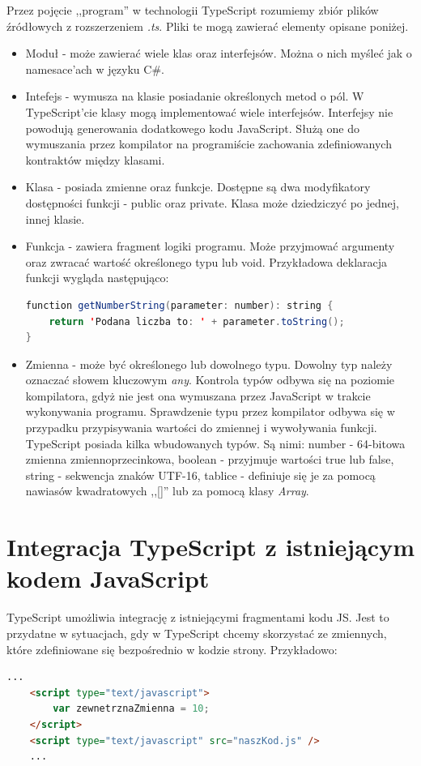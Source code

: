 Przez pojęcie ,,program'' w technologii TypeScript rozumiemy zbiór plików źródłowych z rozszerzeniem \textit{.ts}. Pliki te mogą zawierać elementy opisane poniżej.
\begin{itemize}
\item Moduł - może zawierać wiele klas oraz interfejsów. Można o nich myśleć jak o namesace'ach w języku C\#.
\item Intefejs - wymusza na klasie posiadanie określonych metod o pól. W TypeScript'cie klasy mogą implementować wiele interfejsów. Interfejsy nie powodują generowania dodatkowego kodu JavaScript. Służą one do wymuszania przez kompilator na programiście zachowania zdefiniowanych kontraktów między klasami.
\item Klasa - posiada zmienne oraz funkcje. Dostępne są dwa modyfikatory dostępności funkcji - public oraz private. Klasa może dziedziczyć po jednej, innej klasie.
\item Funkcja - zawiera fragment logiki programu. Może przyjmować argumenty oraz zwracać wartość określonego typu lub void. Przykładowa deklaracja funkcji wygląda następująco:
\begin{lstlisting}[language=Java]
function getNumberString(parameter: number): string {
	return 'Podana liczba to: ' + parameter.toString();
}
\end{lstlisting}
\item Zmienna - może być określonego lub dowolnego typu. Dowolny typ należy oznaczać słowem kluczowym \textit{any}. Kontrola typów odbywa się na poziomie kompilatora, gdyż nie jest ona wymuszana przez JavaScript w trakcie wykonywania programu. Sprawdzenie typu przez kompilator odbywa się w przypadku przypisywania wartości do zmiennej i wywoływania funkcji. TypeScript posiada kilka wbudowanych typów. Są nimi:
\subitem number - 64-bitowa zmienna zmiennoprzecinkowa,
\subitem boolean - przyjmuje wartości true lub false,
\subitem string - sekwencja znaków UTF-16,
\subitem tablice - definiuje się je za pomocą nawiasów kwadratowych ,,[]'' lub za pomocą klasy \textit{Array}.
\end{itemize}

\section{Integracja TypeScript z istniejącym kodem JavaScript}
TypeScript umożliwia integrację z istniejącymi fragmentami kodu JS. Jest to przydatne w sytuacjach, gdy w TypeScript chcemy skorzystać ze zmiennych, które zdefiniowane się bezpośrednio w kodzie strony. Przykładowo:
\begin{lstlisting}[language=HTML]
	...
	<script type="text/javascript">
		var zewnetrznaZmienna = 10;
	</script>
	<script type="text/javascript" src="naszKod.js" />
	...
\end{lstlisting}

